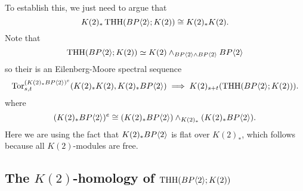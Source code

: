 To establish this, we just need to argue that 
\[
K(2)_*\operatorname{THH}(BP\langle 2 \rangle;K(2))\cong K(2)_*K(2). 
\]
Note that 
\[ \operatorname{THH}(BP\langle 2 \rangle;K(2))\simeq K(2) \wedge_{BP\langle 2 \rangle\wedge BP\langle 2 \rangle}BP\langle 2 \rangle \]
so their is an Eilenberg-Moore spectral sequence 
\begin{equation}\label{EMss}
\operatorname{Tor}^{(K(2)_*BP\langle 2 \rangle)^e}_{s,t}(K(2)_*K(2), K(2)_*BP\langle 2 \rangle)\implies K(2)_{s+t}(\operatorname{THH}(BP\langle 2 \rangle;K(2))).
\end{equation}
where 
\[(K(2)_*BP\langle 2 \rangle)^e\cong (K(2)_*BP\langle 2 \rangle)\wedge_{K(2)_*}  (K(2)_*BP\langle 2 \rangle).\]
Here we are using the fact that $K(2)_*BP\langle 2 \rangle$ is flat over $K(2)_*$, which follows because all $K(2)$-modules are free. 
\begin{comment}
First, recall that the Morava $K$-theories possess a K\"unneth isomorphism, which gives us a B\"okstedt spectral sequence 
\begin{equation}\label{eqn:K(2)Bokstedt}
\HH_*^{K(2)_*}(K(2)_*\B)\implies K(2)_*\THH(\B).
\end{equation}
We will analyze this spectral sequence below to show that $K(2)_*\THH(\B)$ is isomorphic to $K(2)_*\B$. This part of our analysis is a modification of the calculation of $K(1)_*\THH(\ell)$ found in \cite{McClureStaffeldt}. There is also a weak equivalence of spectra
\[
\THH(\B;K(2))\simeq K(2)\wedge_{\B}\THH(\B).
\]
To compute the $K(2)$-homology of this spectrum, we apply a Eilenberg-Moore spectral sequence (cf. \cite[IV, 6.4]{EKMM}), which takes the form 
\[
\Tor^{K(2)_*\B}_{s,t}(K(2)_*K(2), K(2)_*\THH(\B))\implies K(2)_{s+t}(\THH(\B;K(2))).
\]
Once we prove the isomorphism $K(2)_*\THH(\B)\cong K(2)_*\B$, the $E_2$-term is concentrated in $s=0$, resulting in the collapsing of this spectral sequence. This will show that 
\[
K(2)_*\THH(\B;K(2))\cong K(2)_*K(2)
\]
from which we can conclude that every class except those in $P(v_2)\subset \THH(\B;k(2))$ is $v_2$-torsion. From this we will deduce the differentials in the $v_2$-Bockstein spectral sequence. 
\end{comment}
 
\subsection{The $K(2)$-homology of $\operatorname{THH}(BP\langle 2 \rangle;K(2))$}

